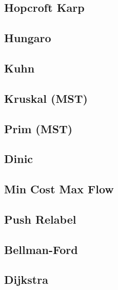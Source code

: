 \subsection{Hopcroft Karp}
\raggedbottom
\hrulefill
\subsection{Hungaro}
\raggedbottom
\hrulefill
\subsection{Kuhn}
\raggedbottom
\hrulefill
\subsection{Kruskal (MST)}
\raggedbottom
\hrulefill
\subsection{Prim (MST)}
\raggedbottom
\hrulefill
\subsection{Dinic}
\raggedbottom
\hrulefill
\subsection{Min Cost Max Flow}
\raggedbottom
\hrulefill
\subsection{Push Relabel}
\raggedbottom
\hrulefill
\subsection{Bellman-Ford}
\raggedbottom
\hrulefill
\subsection{Dijkstra}
\raggedbottom
\hrulefill
